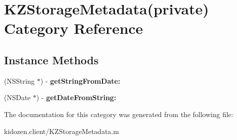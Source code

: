 \hypertarget{category_k_z_storage_metadata_07private_08}{\section{K\-Z\-Storage\-Metadata(private) Category Reference}
\label{category_k_z_storage_metadata_07private_08}
}
\subsection*{Instance Methods}
\begin{DoxyCompactItemize}
\item 
\hypertarget{category_k_z_storage_metadata_07private_08_a813b8386553a40ccc433fb599770707b}{(N\-S\-String $\ast$) -\/ {\bfseries get\-String\-From\-Date\-:}}\label{category_k_z_storage_metadata_07private_08_a813b8386553a40ccc433fb599770707b}

\item 
\hypertarget{category_k_z_storage_metadata_07private_08_a3ad5d89c9dcb4f47c8f78b72cf5ca136}{(N\-S\-Date $\ast$) -\/ {\bfseries get\-Date\-From\-String\-:}}\label{category_k_z_storage_metadata_07private_08_a3ad5d89c9dcb4f47c8f78b72cf5ca136}

\end{DoxyCompactItemize}


The documentation for this category was generated from the following file\-:\begin{DoxyCompactItemize}
\item 
kidozen.\-client/K\-Z\-Storage\-Metadata.\-m\end{DoxyCompactItemize}
